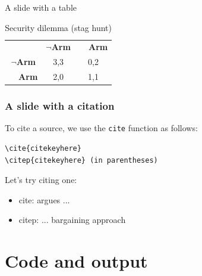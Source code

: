 \documentclass[12pt]{beamer}
\begin{document}
\begin{frame}{A slide with a table}

\begin{table}[h!]
\centering
\caption{Security dilemma (stag hunt)}
\begin{tabular}{ccc}
			& \textbf{$\neg$Arm} & \textbf{~~Arm} \\
			\cline{2-3}
\textbf{$\neg$Arm}   & 
	\multicolumn{1}{|c|}{3,3}& 
	\multicolumn{1}{c|}{0,2} \\
			\cline{2-3}
\textbf{~~Arm}      & 
	\multicolumn{1}{|c|}{2,0}&
	\multicolumn{1}{c|}{1,1}\\
			\cline{2-3}
\end{tabular}
\label{tab:table} %
\end{table}
\end{frame}


\begin{frame}[fragile]\frametitle{A slide with a citation}
 
To cite a source, we use the {\tt cite} function as follows:

{\footnotesize
\begin{verbatim}
\cite{citekeyhere}
\citep{citekeyhere} (in parentheses)
\end{verbatim}
}

Let's try citing one:
\begin{itemize}
	\item cite: \cite{fearonRationalistExplanationsWar1995} argues ...
	\item citep: ... bargaining approach \citep{fearonRationalistExplanationsWar1995}
\end{itemize}
 


\end{frame}





\section{Code and output}
\end{document}
